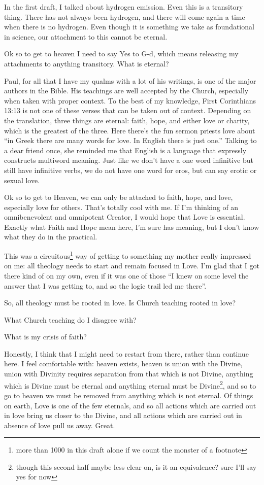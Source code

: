 \documentclass[12pt]{article}
\newcommand{\say}[1]{``#1''}
\renewcommand{\,}{\textsuperscript{,}}
\begin{document}
In the first draft, I talked about hydrogen emission.  
Even this is a transitory thing.  
There has not always been hydrogen, and there will come again a time when there is no hydrogen.  
Even though it is something we take as foundational in science, our attachment to this cannot be eternal.

Ok so to get to heaven I need to say Yes to G-d, which means releasing my attachments to anything transitory.  
What is eternal?

Paul, for all that I have my qualms with a lot of his writings, is one of the major authors in the Bible.  
His teachings are well accepted by the Church, especially when taken with proper context.  
To the best of my knowledge, First Corinthians 13:13 is not one of these verses that can be taken out of context.  
Depending on the translation, three things are eternal: faith, hope, and either love or charity, which is the greatest of the three.  
Here there's the fun sermon priests love about \say{in Greek there are many words for love. In English there is just one.}  
Talking to a dear friend once, she reminded me that English is a language that expressly constructs multiword meaning.  
Just like we don't have a one word infinitive but still have infinitive verbs, we do not have one word for eros, but can say erotic or sexual love.

Ok so to get to Heaven, we can only be attached to faith, hope, and love, especially love for others.  
That's totally cool with me.  
If I'm thinking of an omnibenevolent and omnipotent Creator, I would hope that Love is essential.  
Exactly what Faith and Hope mean here, I'm sure has meaning, but I don't know what they do in the practical.

This was a circuitous\footnote{more than 1000 in this draft alone if we count the monster of a footnote} way of getting to something my mother really impressed on me: all theology needs to start and remain focused in Love.  
I'm glad that I got there kind of on my own, even if it was one of those \say{I knew on some level the answer that I was getting to, and so the logic trail led me there}.

So, all theology must be rooted in love.  
Is Church teaching rooted in love?

What Church teaching do I disagree with?

What is my crisis of faith?

Honestly, I think that I might need to restart from there, rather than continue here.  
I feel comfortable with: heaven exists, heaven is union with the Divine, union with Divinity requires separation from that which is not Divine, anything which is Divine must be eternal and anything eternal must be Divine\footnote{though this second half maybe less clear on, is it an equivalence? sure I'll say yes for now}, and so to go to heaven we must be removed from anything which is not eternal.  
Of things on earth, Love is one of the few eternals, and so all actions which are carried out in love bring us closer to the Divine, and all actions which are carried out in absence of love pull us away.  
Great.
\end{document}
